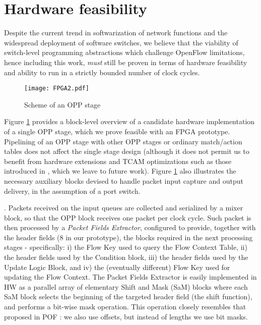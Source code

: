 \documentclass{sig-alternate}
\begin{document}
\section{Hardware feasibility}
\label{s:hardware}

Despite the current trend in softwarization of network functions and the widespread deployment of software switches, we believe that the viability of switch-level programming abstractions which challenge OpenFlow limitations, hence including this work, {\em must} still be proven in terms of hardware feasibility and ability to run in a strictly bounded number of clock cycles. 

\begin{figure}[t]
\centering
   \texttt{[image: FPGA2.pdf]}
   	  \vspace{-2em}
\caption{Scheme of an OPP stage}
	  \vspace{-1.3em}
\label{F:HW_core}
\end{figure}



Figure \ref{F:HW_core} provides a block-level overview of a candidate hardware implementation of a single OPP stage, which we prove feasible with an FPGA prototype. Pipelining of an OPP stage with other OPP stages or ordinary match/action tables does not affect the single stage design (although it does not permit us to benefit from hardware extensions and TCAM optimizations such as those introduced in \cite{Bos13}, which we leave to future work). Figure \ref{F:HW_core} also illustrates the necessary auxiliary blocks devised to handle packet input capture and output delivery, in the assumption of a  port switch.


\vspace{3pt} .
Packets received on the input queues are collected and serialized by a mixer block, so that the OPP block receives one packet per clock cycle. Such packet is then processed by a {\em Packet Fields Extractor}, configured to provide, together  with the header fields (8 in our prototype), the blocks required in the next processing stages - specifically: i) the Flow Key used to query the Flow Context Table, ii) the header fields used by the Condition block, iii) the header fields used by the Update Logic Block, and iv) the (eventually different) Flow Key used for updating the Flow Context. The Packet Fields Extractor is easily implemented in HW as a parallel array of elementary Shift and Mask (SaM) blocks where each SaM block selects the beginning of the targeted header field (the shift function), and performs a bit-wise mask operation. This operation closely resembles that proposed in POF \cite{Son13}: we also use offsets, but instead of lengths we use bit masks.  
\end{document}
